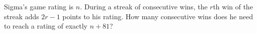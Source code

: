 Sigma's game rating is $n$. During a streak of consecutive wins, the $r$th win of the streak adds $2r-1$ points to his rating. How many consecutive wins does he need to reach a rating of exactly $n+81$?
